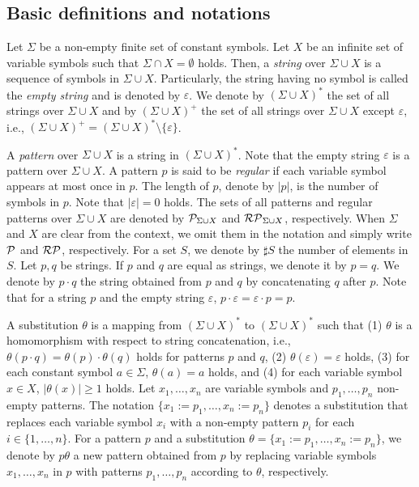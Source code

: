 
\subsection{Basic definitions and notations}\label{subsec:basicdef}

Let $\Sigma$ be a non-empty finite set of constant symbols.
Let $X$ be an infinite set of variable symbols such that $\Sigma \cap X = \emptyset$ holds.
Then, a \textit{string} {\color{red}over} $\Sigma \cup X$ is a sequence of symbols in $\Sigma \cup X$.
Particularly, the string having no symbol is called the \textit{empty string} and is denoted by $\varepsilon$.
We denote by $(\Sigma \cup X)^{\ast}$ the set of all strings {\color{red}over} $\Sigma \cup X$ 
and by $(\Sigma \cup X)^{+}$ the set of all strings {\color{red}over} $\Sigma\cup X$ except $\varepsilon$, i.e., $(\Sigma \cup X)^{+}=(\Sigma \cup X)^{\ast}\setminus \{\varepsilon\}$.

A \textit{pattern} {\color{red}over} $\Sigma \cup X$ is a string in $(\Sigma \cup X)^{\ast}$.
Note that the empty string $\varepsilon$ is a pattern {\color{red}over} $\Sigma \cup X$.
A pattern $p$ is said to be \textit{regular} if each variable symbol appears
at most once in $p$.
The length of $p$, denote by $|p|$, is the number of symbols in $p$.
Note that $|\varepsilon|=0$ holds.
{\color{red} The sets of all patterns and regular patterns {\color{red}over} $\Sigma \cup X$ are denoted by $\mathcal{P}_{\Sigma\cup X}$ and $\mathcal{RP}_{\Sigma\cup X}$, respectively.
When $\Sigma$ and $X$ are clear from the context, 
we omit them in the notation and simply write $\mathcal{P}$ and $\mathcal{RP}$, respectively.}
For a set $S$, we denote by $\sharp S$ the number of elements in $S$.
Let $p,q$ be strings.
If $p$ and $q$ are equal as strings, we denote it by $p=q$.
We denote by $p\cdot q$ the string obtained from $p$ and $q$ by concatenating $q$ after $p$.
Note that for a string $p$ and the empty string $\varepsilon$, $p\cdot \varepsilon = \varepsilon \cdot p = p$.

A substitution $\theta$ is a mapping from $(\Sigma \cup X)^{\ast}$ to $(\Sigma \cup X)^{\ast}$ such that
(1) $\theta$ is a homomorphism with respect to string concatenation, i.e., $\theta(p \cdot q) = \theta(p) \cdot \theta(q)$ holds for patterns $p$ and $q$,
(2) $\theta(\varepsilon)=\varepsilon$ holds,
(3) for each constant symbol $a \in \Sigma$, $\theta(a) = a$ holds,
and (4) for each variable symbol $x \in X$, $|\theta(x)| \geq 1$ holds.
Let $x_{1},\ldots,x_{n}$ are variable symbols and $p_{1},\ldots,p_{n}$ non-empty patterns.
The notation $\{x_{1}:=p_{1},\ldots,x_{n}:=p_{n}\}$ denotes a substitution that replaces each variable symbol $x_{i}$
with a non-empty pattern $p_{i}$ for each $i \in \{1,\ldots,n\}$.
For a pattern $p$ and a substitution $\theta=\{x_{1}:=p_{1},\ldots,x_{n}:=p_{n}\}$, we denote by $p\theta$ a new pattern obtained from $p$ by replacing variable symbols $x_1,\ldots,x_n$ in $p$ with patterns $p_1,\ldots,p_n$ according to $\theta$, respectively.

